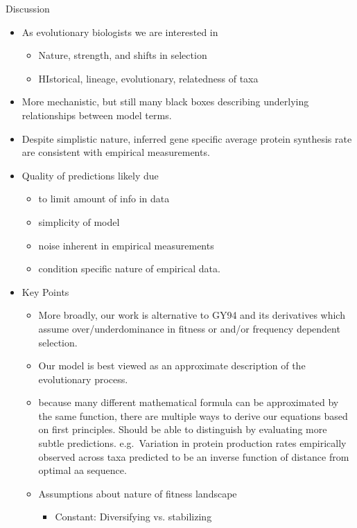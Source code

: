 \documentclass[12pt,letterpaper]{article}
\renewcommand{\subsection}[1]{%
\bigskip
\begin{center}
\begin{large}
\normalfont\itshape #1
\end{large}
\end{center}}
\begin{document}
\subsection*{Discussion}
\begin{itemize}
\item As evolutionary biologists we are interested in
  \begin{itemize}
  \item Nature, strength, and shifts in selection
  \item HIstorical, lineage, evolutionary, relatedness of taxa
  \end{itemize}
\item More mechanistic, but still many black boxes describing underlying relationships between model terms.
\item Despite simplistic nature, inferred gene specific average protein synthesis rate are consistent with empirical measurements.
\item Quality of predictions likely due
  \begin{itemize}
  \item to limit amount of info in data
  \item simplicity of model
  \item noise inherent in empirical measurements
  \item condition specific nature of empirical data.
  \end{itemize}
\item Key Points
  \begin{itemize}
  \item More broadly, our work is alternative to GY94 and its derivatives which assume  over/underdominance in fitness or  and/or frequency dependent selection.
  \item Our model is best viewed as an approximate description of the evolutionary process.
  \item because many different mathematical formula can be approximated by the same function, there are multiple ways to derive our equations based on first principles.
    Should be able to distinguish by evaluating  more subtle predictions.
    e.g.~Variation in protein production rates empirically observed across taxa predicted to be an inverse function of distance from optimal aa sequence.
  \item Assumptions about nature of fitness landscape
    \begin{itemize}
    \item Constant: Diversifying vs. stabilizing

\end{itemize}
\end{itemize}
\end{itemize}
\end{document}
